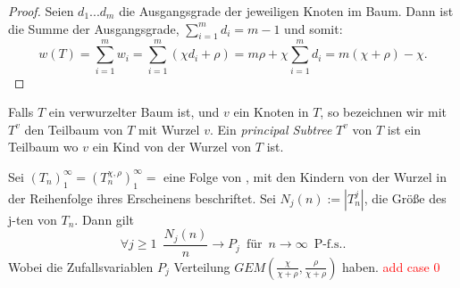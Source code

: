 \begin{proof}
    Seien $d_1...d_m$ die Ausgangsgrade der jeweiligen Knoten im Baum. Dann ist die Summe der Ausgangsgrade, $\sum_{i=1}^{m}d_i = m-1$ und somit:
    \[
     w(T) = \sum_{i=1}^{m}w_i = \sum_{i=1}^{m} (\chi d_i + \rho) = m \rho + \chi \sum_{i = 1}^{m} d_i = m(\chi + \rho) - \chi.
    \]
\end{proof}
\begin{Definition}
    Falls $T$ ein verwurzelter Baum ist, und $v$ ein Knoten in $T$, so bezeichnen wir mit $T^v$ den Teilbaum von $T$ mit Wurzel $v$. Ein \textit{principal Subtree} $T^v$ von $T$ ist ein Teilbaum wo $v$ ein Kind von der Wurzel von $T$ ist.
\end{Definition}
\begin{theorem} \cite[Theorem 3.2]{janson2019random}
    \label{linpreft Grenzwert}
    Sei $(T_n)_1^\infty =(T_n^{\chi,\rho})_1^\infty = $ eine Folge von \linpreft, mit den Kindern von der Wurzel in der Reihenfolge ihres Erscheinens beschriftet. Sei $N_j(n) := |T^j_n|$, die Größe des j-ten \PsubT von $T_n$. Dann gilt 
    \[ 
        \forall j \geq 1  \hspace{6pt} \frac{N_j(n)}{n}  \rightarrow P_j \hspace{6pt} \text{für} \hspace{6pt} n \rightarrow \infty \hspace{6pt} \text{P-f.s.}.
  \]
Wobei die Zufallsvariablen  $P_j$ Verteilung $GEM(\frac{\chi}{\chi+\rho},{\frac{\rho}{\chi+\rho}})$ haben. \textcolor{red}{add case 0} 
\end{theorem}
